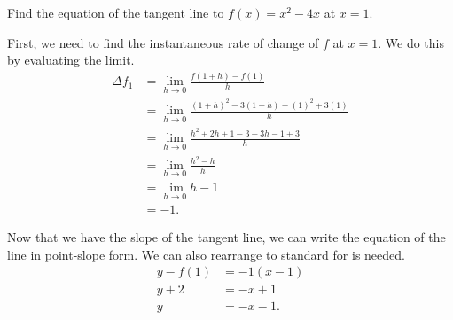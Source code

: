 \begin{example}
	Find the equation of the tangent line to $f(x)=x^2-4x$ at $x=1$.
\end{example}
\begin{answer}
	First, we need to find the instantaneous rate of change of $f$ at $x=1$.
	We do this by evaluating the limit.
	\begin{align*}
		\Delta f_{1} &= \lim_{h \to 0}{\frac{f(1+h)-f(1)}{h}} \\
		&= \lim_{h \to 0}{\frac{(1+h)^2-3(1+h) - (1)^2 + 3(1)}{h}} \\
		&= \lim_{h \to 0}{\frac{h^2 + 2h + 1 - 3 - 3h - 1 + 3}{h}} \\
		&= \lim_{h \to 0}{\frac{h^2 - h}{h}} \\
		&= \lim_{h \to 0}{h - 1} \\
		&= -1.
	\end{align*}
	
	Now that we have the slope of the tangent line, we can write the equation of the line in point-slope form.
	We can also rearrange to standard for is needed.
	\begin{align*}
		y - f(1) &= -1(x - 1) \\
		y + 2 &= -x + 1 \\
		y &= -x - 1.
	\end{align*}
\end{answer}